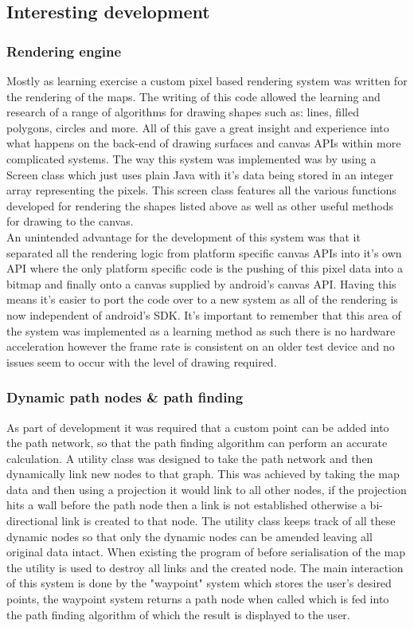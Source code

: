 \subsection{Interesting development}
\subsubsection{Rendering engine}
Mostly as learning exercise a custom pixel based rendering system was written for the rendering of the maps. The writing of this code allowed the learning and research of a range of algorithms for drawing shapes such as: lines, filled polygons, circles and more. All of this gave a great insight and experience into what happens on the back-end of drawing surfaces and canvas APIs within more complicated systems. The way this system was implemented was by using a Screen class which just uses plain Java with it's data being stored in an integer array representing the pixels. This screen class features all the various functions developed for rendering the shapes listed above as well as other useful methods for drawing to the canvas.\\

An unintended advantage for the development of this system was that it separated all the rendering logic from platform specific canvas APIs into it's own API where the only platform specific code is the pushing of this pixel data into a bitmap and finally onto a canvas supplied by android's canvas API. Having this means it's easier to port the code over to a new system as all of the rendering is now independent of android's SDK. It's important to remember that this area of the system was implemented as a learning method as such there is no hardware acceleration however the frame rate is consistent on an older test device and no issues seem to occur with the level of drawing required.

\subsubsection{Dynamic path nodes \& path finding}
As part of development it was required that a custom point can be added into the path network, so that the path finding algorithm can perform an accurate calculation. A utility class was designed to take the path network and then dynamically link new nodes to that graph. This was achieved by taking the map data and then using a projection it would link to all other nodes, if the projection hits a wall before the path node then a link is not established otherwise a bi-directional link is created to that node. The utility class keeps track of all these dynamic nodes so that only the dynamic nodes can be amended leaving all original data intact. When existing the program of before serialisation of the map the utility is used to destroy all links and the created node. The main interaction of this system is done by the "waypoint" system which stores the user's desired points, the waypoint system returns a path node when called which is fed into the path finding algorithm of which the result is displayed to the user.


